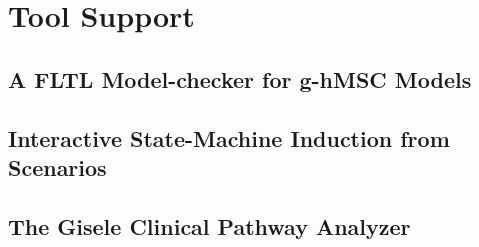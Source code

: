 \chapter{Tool Support\label{chapter:tool-support}}

\section{A FLTL Model-checker for g-hMSC Models}
\section{Interactive State-Machine Induction from Scenarios}
\section{The Gisele Clinical Pathway Analyzer}

